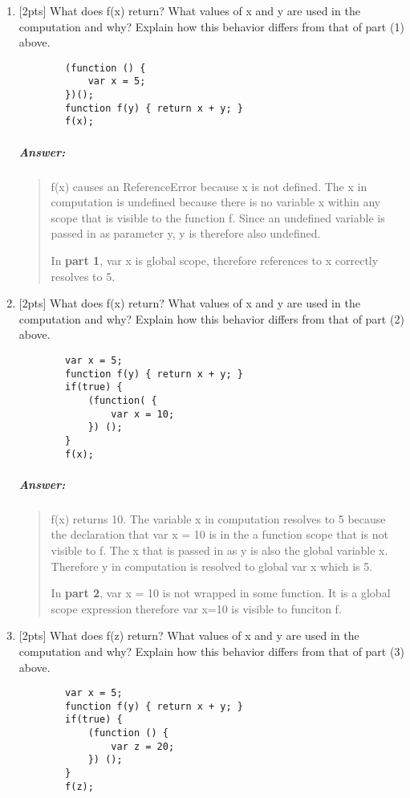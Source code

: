 \documentclass{article}
\begin{document}
\begin{enumerate}[label=\textbf{\arabic*}.]
	\item {[2pts]} What does f(x) return? What values of x and y are used
		in the computation and why? Explain how this behavior differs from that of 
		part (1) above.

		\begin{lstlisting}
		(function () {
			var x = 5;
		})();
		function f(y) { return x + y; }
		f(x);
		\end{lstlisting}

		\subparagraph{Answer: }
			\begin{quote}
			f(x) causes an ReferenceError because x is not defined. The x in
			computation is undefined because there is no variable x within any scope
			that is visible to the function f. Since an undefined variable is passed
			in as parameter y, y is therefore also undefined.
			\par In \textbf{part 1}, var x is global scope, 
			therefore references to x correctly resolves
			to 5.
			\end{quote}


	\item{[2pts]} What does f(x) return? What values of x and y are used
		in the computation and why? Explain how this behavior differs from that of part 
		(2) above.

		\begin{lstlisting}
		var x = 5;
		function f(y) { return x + y; }
		if(true) {
			(function( {
				var x = 10;
			}) ();
		}
		f(x);
		\end{lstlisting}

		\subparagraph{Answer: }
			\begin{quote}
			f(x) returns 10. The variable x in computation resolves to 5 because the 
			declaration that var x = 10 is in the a function scope that is not visible
			to f. The x that is passed in as y is also the global variable x.
			Therefore y in computation is resolved to global var x which is 5.
			\par In \textbf{part 2}, var x = 10 is not wrapped in some function. 
			It is a global scope expression therefore var x=10 is visible to funciton f.
			\end{quote}


	\item{[2pts]} What does f(z) return? What values of x and y are used
		in the computation and why? Explain how this behavior differs from that of 
		part (3) above.

		\begin{lstlisting}
		var x = 5;
		function f(y) { return x + y; }
		if(true) {
			(function () {
				var z = 20;
			}) ();
		}
		f(z);
		\end{lstlisting}


\end{enumerate}
\end{document}
